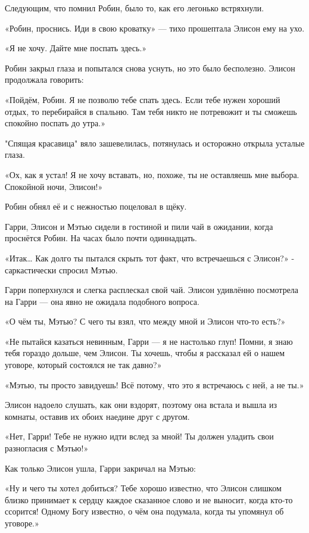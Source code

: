 \documentclass[a5paper, 9pt,
final, openany, twoside=true]{memoir}
\begin{document}
Следующим, что помнил Робин, было то, как его легонько встряхнули.

«Робин, проснись. Иди в свою кроватку» — тихо прошептала Элисон ему на ухо.

«Я не хочу. Дайте мне поспать здесь.»

Робин закрыл глаза и попытался снова уснуть, но это было бесполезно. Элисон продолжала говорить:

«Пойдём, Робин. Я не позволю тебе спать здесь. Если тебе нужен хороший отдых, то перебирайся в спальню. Там тебя никто не потревожит и ты сможешь спокойно поспать до утра.»

"Спящая красавица" вяло зашевелилась, потянулась и осторожно открыла усталые глаза.

«Ох, как я устал! Я не хочу вставать, но, похоже, ты не оставляешь мне выбора. Спокойной ночи, Элисон!»

Робин обнял её и с нежностью поцеловал в щёку.\bigskip

Гарри, Элисон и Мэтью сидели в гостиной и пили чай в ожидании, когда проснётся Робин. На часах было почти одиннадцать.

«Итак… Как долго ты пытался скрыть тот факт, что встречаешься с Элисон?» - саркастически спросил Мэтью.

Гарри поперхнулся и слегка расплескал свой чай. Элисон удивлённо посмотрела на Гарри — она явно не ожидала подобного вопроса.

«О чём ты, Мэтью? С чего ты взял, что между мной и Элисон что-то есть?»

«Не пытайся казаться невинным, Гарри — я не настолько глуп! Помни, я знаю тебя гораздо дольше, чем Элисон. Ты хочешь, чтобы я рассказал ей о нашем уговоре, который состоялся не так давно?»

«Мэтью, ты просто завидуешь! Всё потому, что это я встречаюсь с ней, а не ты.»

Элисон надоело слушать, как они вздорят, поэтому она встала и вышла из комнаты, оставив их обоих наедине друг с другом.

«Нет, Гарри! Тебе не нужно идти вслед за мной! Ты должен уладить свои разногласия с Мэтью!»

Как только Элисон ушла, Гарри закричал на Мэтью:

«Ну и чего ты хотел добиться? Тебе хорошо известно, что Элисон слишком близко принимает к сердцу каждое сказанное слово и не выносит, когда кто-то ссорится! Одному Богу известно, о чём она подумала, когда ты упомянул об уговоре.»
\end{document}
